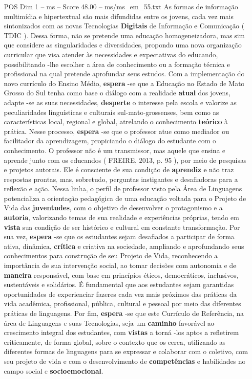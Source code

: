 \begin{textsample}{POS Dim 1 – ms – Score 48.00 – ms/ms\_em\_55.txt}
As formas de informação multimídia e hipertextual são mais difundidas entre os jovens, cada vez mais sintonizados com as novas Tecnologias \textbf{Digitais} de Informação e Comunicação ( TDIC ).
Dessa forma, não se pretende uma educação homogeneizadora, mas sim que considere as singularidades e diversidades, propondo uma nova organização curricular que visa atender às necessidades e expectativas do educando, possibilitando -lhe escolher a área de conhecimento ou a formação técnica e profissional na qual pretende aprofundar seus estudos.
Com a implementação do novo currículo do Ensino Médio, \textbf{espera} -se que a Educação no Estado de Mato Grosso do Sul tenha como base o diálogo com a realidade \textbf{atual} dos jovens, adapte -se as suas necessidades, \textbf{desperte} o interesse pela escola e valorize as peculiaridades linguísticas e culturais sul-mato-grossenses, bem como as características local, regional e global, atrelando o conhecimento \textbf{teórico} à prática.
Nesse processo, \textbf{espera} -se que o professor atue como mediador ou facilitador da aprendizagem, propiciando o diálogo do estudante com o conhecimento.
O professor não é um transmissor, mas aquele que ensina e aprende junto com os educandos ( FREIRE, 2013, p. 95 ), por meio de pesquisas e projetos autorais.
Ele é consciente de sua condição de \textbf{aprendiz} e não traz respostas prontas, mas, sobretudo, perguntas instigantes e desafiadoras para a reflexão e ação.
Nessa linha, o perfil de professor visto pela Área de Linguagens potencializa a orientação pedagógica de uma educação voltada para o Projeto de Vida das \textbf{juventudes}, com o objetivo de desenvolver o protagonismo e a \textbf{autoria}, valorizando temas de sua realidade e experiências próprias, tendo em \textbf{vista} sua condição de ser histórico e cultural em constante transformação.
Por sua vez, \textbf{espera} -se que os estudantes sejam desafiados a participar de forma ativa, dinâmica, \textbf{crítica} e criativa na sociedade, ampliando e aprofundando seus conhecimentos para construção de seu Projeto de Vida, reconhecendo a importância de sua intervenção social, ao tomar decisões com autonomia e de \textbf{maneira} responsável, com base em princípios éticos, democráticos, inclusivos, sustentáveis e solidários.
É fundamental que aos estudantes sejam garantidas oportunidades de experienciar fazeres cada vez mais próximos das práticas da vida acadêmica, profissional, pública, cultural e pessoal por meio das diferentes práticas de linguagens.
Por fim, \textbf{espera} -se que este Currículo de Referência, na área de Linguagens e suas Tecnologias, seja um \textbf{caminho} favorável ao crescimento integral dos estudantes, com \textbf{vistas} a torná -los aptos a refletirem criticamente, de forma global, sobre o contexto que os cerca, utilizando as diferentes formas de linguagens para se expressar e colaborar com o coletivo, com seu projeto de vida e com o desenvolvimento de \textbf{competências} e habilidades no campo social e \textbf{socioemocional}.

\end{textsample}
